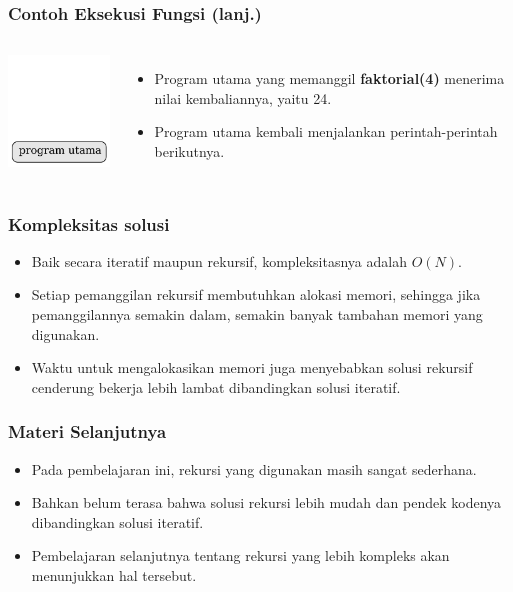 \begin{frame}
\frametitle{Contoh Eksekusi Fungsi (lanj.)}
\begin{columns}
    \centering
    \includegraphics[width=4cm]{asset/rekursi-1.pdf}
    \begin{itemize}
      \item Program utama yang memanggil \textbf{faktorial(4)} menerima nilai kembaliannya, yaitu 24.
      \item Program utama kembali menjalankan perintah-perintah berikutnya.
    \end{itemize}
  \end{columns} 
\end{frame}

\begin{frame}
\frametitle{Kompleksitas solusi}
\begin{itemize}
  \item Baik secara iteratif maupun rekursif, kompleksitasnya adalah $O(N)$.
  \item Setiap pemanggilan rekursif membutuhkan alokasi memori, sehingga jika pemanggilannya semakin dalam, semakin banyak tambahan memori yang digunakan.
  \item Waktu untuk mengalokasikan memori juga menyebabkan solusi rekursif cenderung bekerja lebih lambat dibandingkan solusi iteratif.
\end{itemize}
\end{frame}

\begin{frame}
\frametitle{Materi Selanjutnya}
\begin{itemize}
  \item Pada pembelajaran ini, rekursi yang digunakan masih sangat sederhana.
  \item Bahkan belum terasa bahwa solusi rekursi lebih mudah dan pendek kodenya dibandingkan solusi iteratif.
  \item Pembelajaran selanjutnya tentang rekursi yang lebih kompleks akan menunjukkan hal tersebut.
\end{itemize}
\end{frame}


